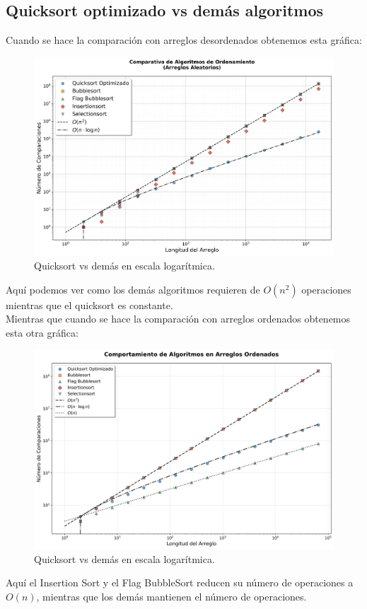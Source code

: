 \documentclass[conference]{IEEEtran}
\begin{document}
\subsection{Quicksort optimizado vs demás algoritmos}

Cuando se hace la comparación con arreglos desordenados obtenemos esta gráfica:

\begin{figure}[H]
    \centering
    \includegraphics[scale=0.3]{../Gráficas/Exp2A.png}
    \caption{Quicksort vs demás en escala logarítmica.}\label{fig:exp2A}
\end{figure}
Aquí podemos ver como los demás algoritmos requieren de $O(n^2)$ operaciones mientras que el quicksort es constante.\\
Mientras que cuando se hace la comparación con arreglos ordenados obtenemos esta otra gráfica:

\begin{figure}[H]
    \centering
    \includegraphics[scale=0.3]{../Gráficas/Exp2B.png}
    \caption{Quicksort vs demás en escala logarítmica.}\label{fig:exp2B}
\end{figure}
Aquí el Insertion Sort y el Flag BubbleSort reducen su número de operaciones a $O(n)$, mientras que los demás mantienen el número de operaciones.
\end{document}
